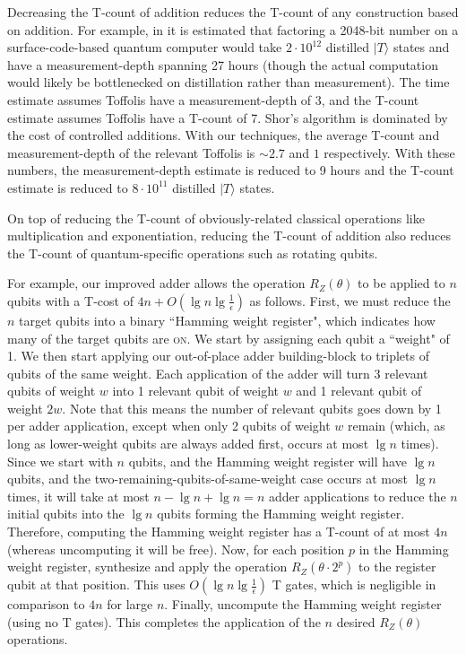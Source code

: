 \documentclass[twocolumn,accepted=2018-05-25]{quantumarticle}
\begin{document}
Decreasing the T-count of addition reduces the T-count of any construction based on addition.
For example, in \cite{Fowler2012} it is estimated that factoring a 2048-bit number on a surface-code-based quantum computer would take $2 \cdot 10^{12}$ distilled $|T\rangle$ states and have a measurement-depth spanning 27 hours (though the actual computation would likely be bottlenecked on distillation rather than measurement).
The time estimate assumes Toffolis have a measurement-depth of 3, and the T-count estimate assumes Toffolis have a T-count of 7.
Shor's algorithm is dominated by the cost of controlled additions.
With our techniques, the average T-count and measurement-depth of the relevant Toffolis is $\sim 2.7$ and $1$ respectively.
With these numbers, the measurement-depth estimate is reduced to 9 hours and the T-count estimate is reduced to $8 \cdot 10^{11}$ distilled $|T\rangle$ states.

On top of reducing the T-count of obviously-related classical operations like multiplication and exponentiation, reducing the T-count of addition also reduces the T-count of quantum-specific operations such as rotating qubits.

For example, our improved adder allows the operation $R_Z(\theta)$ to be applied to $n$ qubits with a T-cost of $4n + O(\lg n \lg \frac{1}{\epsilon})$ as follows.
First, we must reduce the $n$ target qubits into a binary ``Hamming weight register", which indicates how many of the target qubits are \textsc{on}.
We start by assigning each qubit a ``weight" of 1.
We then start applying our out-of-place adder building-block to triplets of qubits of the same weight.
Each application of the adder will turn 3 relevant qubits of weight $w$ into 1 relevant qubit of weight $w$ and 1 relevant qubit of weight $2w$.
Note that this means the number of relevant qubits goes down by 1 per adder application, except when only 2 qubits of weight $w$ remain (which, as long as lower-weight qubits are always added first, occurs at most $\lg n$ times).
Since we start with $n$ qubits, and the Hamming weight register will have $\lg n$ qubits, and the two-remaining-qubits-of-same-weight case occurs at most $\lg n$ times, it will take at most $n - \lg n + \lg n = n$ adder applications to reduce the $n$ initial qubits into the $\lg n$ qubits forming the Hamming weight register.
Therefore, computing the Hamming weight register has a T-count of at most $4n$ (whereas uncomputing it will be free).
Now, for each position $p$ in the Hamming weight register, synthesize and apply the operation $R_Z(\theta \cdot 2^p)$ to the register qubit at that position.
This uses $O(\lg n \lg \frac{1}{\epsilon})$ T gates, which is negligible in comparison to $4n$ for large $n$.
Finally, uncompute the Hamming weight register (using no T gates).
This completes the application of the $n$ desired $R_Z(\theta)$ operations.
\end{document}
